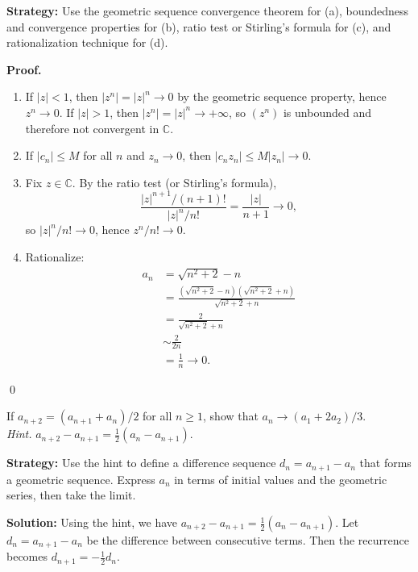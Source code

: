 \noindent\textbf{Strategy:} Use the geometric sequence convergence theorem for (a), boundedness and convergence properties for (b), ratio test or Stirling's formula for (c), and rationalization technique for (d).

\noindent\textbf{Proof.}
\begin{enumerate}[label=(\alph*)]
\item If $|z|<1$, then $|z^n|=|z|^n\to 0$ by the geometric sequence property, hence $z^n\to 0$. If $|z|>1$, then $|z^n|=|z|^n\to +\infty$, so $(z^n)$ is unbounded and therefore not convergent in $\mathbb{C}$.
\item If $|c_n|\le M$ for all $n$ and $z_n\to 0$, then $|c_n z_n|\le M|z_n|\to 0$.
\item Fix $z\in\mathbb{C}$. By the ratio test (or Stirling's formula),
\[
\frac{|z|^{n+1}/(n+1)!}{|z|^n/n!}=\frac{|z|}{n+1}\to 0,
\]
so $|z|^n/n!\to 0$, hence $z^n/n!\to 0$.
\item Rationalize:
\begin{align*}
a_n&=\sqrt{n^2+2}-n\\
&=\frac{(\sqrt{n^2+2}-n)(\sqrt{n^2+2}+n)}{\sqrt{n^2+2}+n}\\
&=\frac{2}{\sqrt{n^2+2}+n}\\
&\sim \frac{2}{2n}\\
&=\frac{1}{n}\to 0.
\end{align*}
\end{enumerate}\qed
\medskip



\begin{problembox}
\begin{problemstatement}
If $a_{n+2} = (a_{n+1} + a_n)/2$ for all $n \geq 1$, show that $a_n \to (a_1 + 2a_2)/3$. \\
\textit{Hint.} $a_{n+2} - a_{n+1} = \frac{1}{2}(a_n - a_{n+1})$.
\end{problemstatement}
\end{problembox}

\noindent\textbf{Strategy:} Use the hint to define a difference sequence $d_n = a_{n+1} - a_n$ that forms a geometric sequence. Express $a_n$ in terms of initial values and the geometric series, then take the limit.

\bigskip\noindent\textbf{Solution:}
Using the hint, we have $a_{n+2} - a_{n+1} = \frac{1}{2}(a_n - a_{n+1})$. Let $d_n = a_{n+1} - a_n$ be the difference between consecutive terms. Then the recurrence becomes $d_{n+1} = -\frac{1}{2}d_n$.

